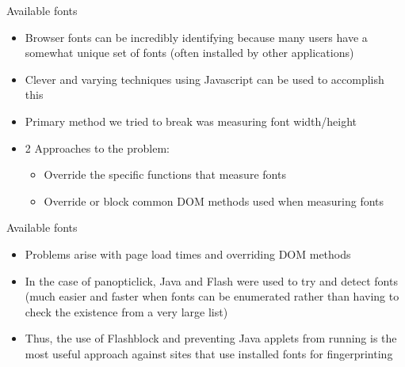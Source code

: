 \begin{frame}[fragile,t]{Available fonts}
	\begin{itemize}
		\item Browser fonts can be incredibly identifying because many users have a somewhat unique set of fonts (often installed by other applications)
		\item Clever and varying techniques using Javascript can be used to accomplish this
		\item Primary method we tried to break was measuring font width/height
		\item 2 Approaches to the problem:
			\begin{itemize}
				\item Override the specific functions that measure fonts
				\item Override or block common DOM methods used when measuring fonts
			\end{itemize}
	\end{itemize}
\end{frame}

\begin{frame}[fragile,t]{Available fonts}
	\begin{itemize}
		\item Problems arise with page load times and overriding DOM methods
		\item In the case of panopticlick, Java and Flash were used to try and detect fonts (much easier and faster when fonts can be enumerated rather than having to check the existence from a very large list)
		\item Thus, the use of Flashblock and preventing Java applets from running is the most useful approach against sites that use installed fonts for fingerprinting
	\end{itemize}
\end{frame}

